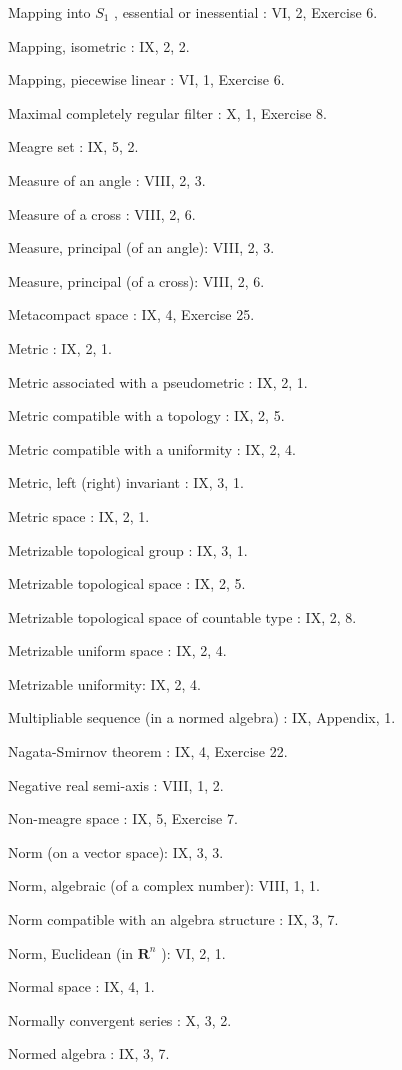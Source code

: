 Mapping into \(S_{1}\) , essential or inessential : VI, 2, Exercise 6.

Mapping, isometric : IX, 2, 2.

Mapping, piecewise linear : VI, 1, Exercise 6.

Maximal completely regular filter : X, 1, Exercise 8.

Meagre set : IX, 5, 2.

Measure of an angle : VIII, 2, 3.

Measure of a cross : VIII, 2, 6.

Measure, principal (of an angle): VIII, 2, 3.

Measure, principal (of a cross): VIII, 2, 6.

Metacompact space : IX, 4, Exercise 25.

Metric : IX, 2, 1.

Metric associated with a pseudometric : IX, 2, 1.

Metric compatible with a topology : IX, 2, 5.

Metric compatible with a uniformity : IX, 2, 4.

Metric, left (right) invariant : IX, 3, 1.

Metric space : IX, 2, 1.

Metrizable topological group : IX, 3, 1.

Metrizable topological space : IX, 2, 5.

Metrizable topological space of countable type : IX, 2, 8.

Metrizable uniform space : IX, 2, 4.

Metrizable uniformity: IX, 2, 4.

Multipliable sequence (in a normed algebra) : IX, Appendix, 1.

Nagata-Smirnov theorem : IX, 4, Exercise 22.

Negative real semi-axis : VIII, 1, 2.

Non-meagre space : IX, 5, Exercise 7.

Norm (on a vector space): IX, 3, 3.

Norm, algebraic (of a complex number): VIII, 1, 1.

Norm compatible with an algebra structure : IX, 3, 7.

Norm, Euclidean (in \(\mathbf{R}^n\) ): VI, 2, 1.

Normal space : IX, 4, 1.

Normally convergent series : X, 3, 2.

Normed algebra : IX, 3, 7.

